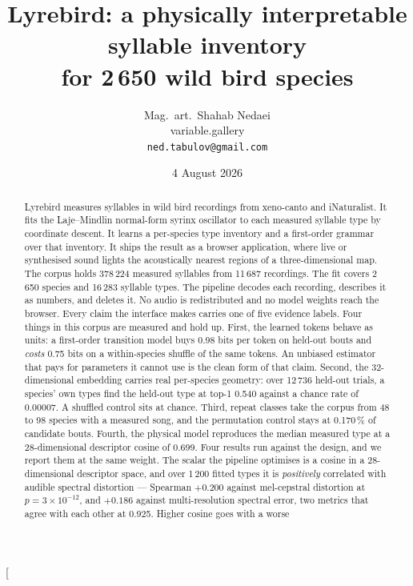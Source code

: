 \documentclass[10pt,twocolumn,a4paper]{article}
\title{\textbf{Lyrebird: a physically interpretable syllable inventory\\
for 2\,650 wild bird species}}
\author{Mag.~art.~Shahab Nedaei\\
  \normalsize variable.gallery\\
  \normalsize \texttt{ned.tabulov@gmail.com}}
\date{4 August 2026}
\begin{document}
\makeatletter
\twocolumn[\begin{@twocolumnfalse}
\maketitle
\begin{abstract}
\noindent
Lyrebird measures syllables in wild bird recordings from xeno-canto and iNaturalist. It
fits the Laje--Mindlin normal-form syrinx oscillator to each measured syllable type by
coordinate descent. It learns a per-species type inventory and a first-order grammar over
that inventory. It ships the result as a browser application, where live or synthesised
sound lights the acoustically nearest regions of a three-dimensional map. The corpus holds
378\,224 measured syllables from 11\,687 recordings. The fit covers 2\,650 species and
16\,283 syllable types. The pipeline decodes each recording, describes it as numbers, and
deletes it. No audio is redistributed and no model weights reach the browser. Every claim
the interface makes carries one of five evidence labels.
%
Four things in this corpus are measured and hold up. First, the learned tokens behave as
units: a first-order transition model buys 0.98 bits per token on held-out bouts and
\emph{costs} 0.75 bits on a within-species shuffle of the same tokens. An unbiased
estimator that pays for parameters it cannot use is the clean form of that claim. Second,
the 32-dimensional embedding carries real per-species geometry: over 12\,736 held-out
trials, a species' own types find the held-out type at top-1 0.540 against a chance rate of
0.00007. A shuffled control sits at chance. Third, repeat classes take the corpus from 48 to
98 species with a measured song, and the permutation control stays at 0.170\,\% of candidate
bouts. Fourth, the physical model reproduces the median measured type at a 28-dimensional
descriptor cosine of 0.699.
%
Four results run against the design, and we report them at the same weight. The scalar the
pipeline optimises is a cosine in a 28-dimensional descriptor space, and over 1\,200 fitted
types it is \emph{positively} correlated with audible spectral distortion --- Spearman $+0.200$
against mel-cepstral distortion at $p = 3\times10^{-12}$, and $+0.186$ against multi-resolution
spectral error, two metrics that agree with each other at 0.925. Higher cosine goes with a worse

\end{abstract}
\end{@twocolumnfalse}
\end{document}
